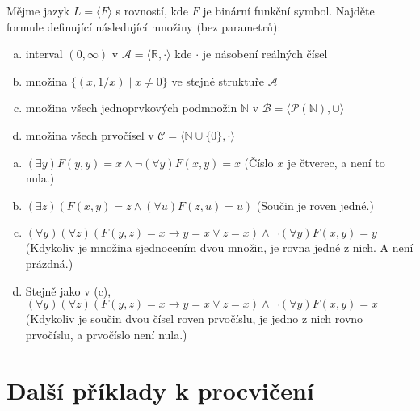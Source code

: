 \begin{problem}

    Mějme jazyk $L=\langle F \rangle$ s rovností, kde $F$ je binární funkční symbol. Najděte formule definující následující množiny (bez parametrů):
    \begin{enumerate}[(a)]
        \item interval $(0,\infty)$ v $\mathcal A=\langle\mathbb R, \cdot\rangle$ kde $\cdot$ je násobení reálných čísel
        \item množina $\{(x, 1/x)\mid x\neq 0\}$ ve stejné struktuře $\mathcal A$
        \item množina všech jednoprvkových podmnožin $\mathbb N$ v $\mathcal B=\langle\mathcal P(\mathbb N),\cup\rangle$
        \item množina všech prvočísel v $\mathcal C=\langle \mathbb N\cup\{0\}, \cdot\rangle$
    \end{enumerate}

    \begin{solution}

        \begin{enumerate}[(a)]
            \item $(\exists y)F(y,y)=x\land \neg (\forall y)F(x,y)=x$ (Číslo $x$ je čtverec, a není to nula.)
            \item $(\exists z)(F(x,y)=z\land(\forall u)F(z,u)=u)$ (Součin je roven jedné.)
            \item $(\forall y)(\forall z)(F(y,z)=x\to y=x\lor z=x)\land\neg(\forall y)F(x,y)=y$ (Kdykoliv je množina sjednocením dvou množin, je rovna jedné z nich. A není prázdná.)
            \item Stejně jako v (c), $(\forall y)(\forall z)(F(y,z)=x\to y=x\lor z=x)\land\neg(\forall y)F(x,y)=x$ (Kdykoliv je součin dvou čísel roven prvočíslu, je jedno z nich rovno prvočíslu, a prvočíslo není nula.)
        \end{enumerate}
                    
    \end{solution}

\end{problem}
        
        
\section*{Další příklady k procvičení}


